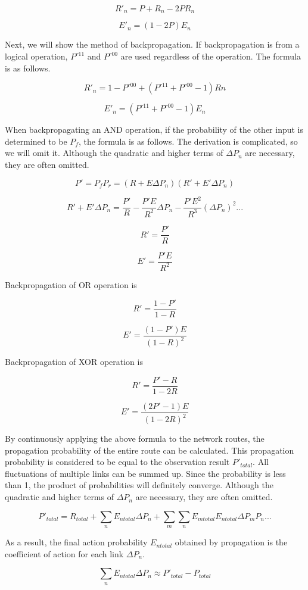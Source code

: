 \documentclass[12pt]{article}
\begin{document}
\[ R'_n = P + R_n-2PR_n\]

\[ E'_n = (1-2P)E_n\]

Next, we will show the method of backpropagation. If backpropagation is
from a logical operation, \(P^{r11}\) and \(P^{r00}\) are used
regardless of the operation. The formula is as follows.

\[ R'_n=1-P^{r00}+(P^{r11}+P^{r00}-1)Rn\]

\[ E'_n= (P^{r11}+P^{r00}-1)E_n\]

When backpropagating an AND operation, if the probability of the other
input is determined to be \(P_f\), the formula is as follows. The
derivation is complicated, so we will omit it. Although the quadratic
and higher terms of \(\Delta P_n\) are necessary, they are often
omitted.

\[ P'=P_fP_r = (R+E\Delta P_n)(R'+E'\Delta P_n)\]

\[ R'+E'\Delta P_n =\frac{P'}{R} - \frac{P'E}{R^2}\Delta P_n -\frac{P'E^2}{R^3}(\Delta P_n)^2 ...\]

\[ R' = \frac{P'}{R}\]

\[ E' = \frac{P'E}{R^2} \]

Backpropagation of OR operation is

\[ R' = \frac{1-P'}{1-R}\]

\[ E' = \frac{(1-P')E}{(1-R)^2} \]

Backpropagation of XOR operation is

\[ R' = \frac{P'-R}{1-2R}\]

\[ E' = \frac{(2P'-1)E}{(1-2R)^2} \]

By continuously applying the above formula to the network routes, the
propagation probability of the entire route can be calculated. This
propagation probability is considered to be equal to the observation
result \(P'_{total}\). All fluctuations of multiple links can be summed
up. Since the probability is less than 1, the product of probabilities
will definitely converge. Although the quadratic and higher terms of
\(\Delta P_n\) are necessary, they are often omitted.

\[ P'_{total} = R_{total}+ \sum _n E_{n total}\Delta P_n + \sum _m \sum _n E_{m total}E_{n total}\Delta P_m P_n ... \]

As a result, the final action probability \(E_{ntotal}\) obtained by
propagation is the coefficient of action for each link \(\Delta P_{n}\).

\[\sum_{n} E_{ntotal} \Delta P_{n} \approx P'_{total} - P_{total}\] 
\end{document}
